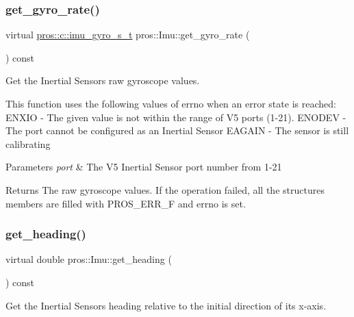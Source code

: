 \subsubsection{\texorpdfstring{get\+\_\+gyro\+\_\+rate()}{get\_gyro\_rate()}}
{\footnotesize\ttfamily virtual \hyperlink{imu_8h_a5b9e240cfb181cce3c741e29efbbbf23}{pros\+::c\+::imu\+\_\+gyro\+\_\+s\+\_\+t} pros\+::\+Imu\+::get\+\_\+gyro\+\_\+rate (\begin{DoxyParamCaption}{ }\end{DoxyParamCaption}) const\hspace{0.3cm}{\ttfamily [virtual]}}



Get the Inertial Sensor\textquotesingle{}s raw gyroscope values. 

This function uses the following values of errno when an error state is reached\+: E\+N\+X\+IO -\/ The given value is not within the range of V5 ports (1-\/21). E\+N\+O\+D\+EV -\/ The port cannot be configured as an Inertial Sensor E\+A\+G\+A\+IN -\/ The sensor is still calibrating


\begin{DoxyParams}{Parameters}
{\em port} & The V5 Inertial Sensor port number from 1-\/21 \\
\hline
\end{DoxyParams}
\begin{DoxyReturn}{Returns}
The raw gyroscope values. If the operation failed, all the structure\textquotesingle{}s members are filled with P\+R\+O\+S\+\_\+\+E\+R\+R\+\_\+F and errno is set. 
\end{DoxyReturn}
\mbox{\label{classpros_1_1Imu_a35c7953c5def3c034763af25c4dbebe3}} 
\subsubsection{\texorpdfstring{get\+\_\+heading()}{get\_heading()}}
{\footnotesize\ttfamily virtual double pros\+::\+Imu\+::get\+\_\+heading (\begin{DoxyParamCaption}{ }\end{DoxyParamCaption}) const\hspace{0.3cm}{\ttfamily [virtual]}}



Get the Inertial Sensor\textquotesingle{}s heading relative to the initial direction of its x-\/axis. 

